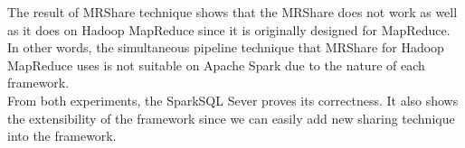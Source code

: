 The result of MRShare technique shows that the MRShare does not work as well as it does on Hadoop MapReduce since it is originally designed for MapReduce. In other words, the simultaneous pipeline technique that MRShare for Hadoop MapReduce uses is not suitable on Apache Spark due to the nature of each framework.\\

From both experiments, the SparkSQL Sever proves its correctness. It also shows the extensibility of the framework since we can easily add new sharing technique into the framework.
